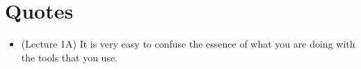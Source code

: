 \documentclass[12pt,a4paper]{article}
\begin{document}
\section{Quotes}

\begin{itemize}
\item (Lecture 1A) It is very easy to confuse the essence of what you are doing with the
  tools that you use.
\end{itemize}

\nocite{*}


\end{document}
